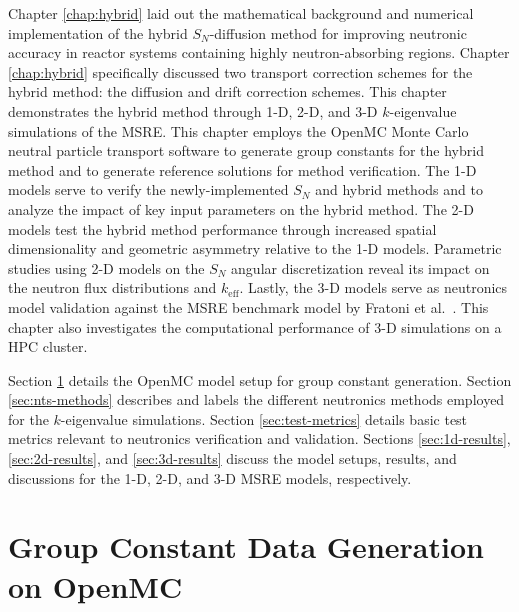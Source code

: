 Chapter \ref{chap:hybrid} laid out the mathematical background and numerical implementation
of the hybrid $S_N$-diffusion method for improving neutronic accuracy in reactor systems containing
highly neutron-absorbing regions. Chapter \ref{chap:hybrid} specifically discussed two transport
correction schemes for the hybrid method: the diffusion and drift correction
schemes. This chapter demonstrates
the hybrid method through 1-D, 2-D, and 3-D $k$-eigenvalue simulations of the \gls{MSRE}.
This chapter employs the OpenMC Monte Carlo neutral particle transport software \cite{romano_openmc:_2015} to
generate group constants for the hybrid method and to generate reference solutions for method verification.
The 1-D models serve to verify the newly-implemented $S_N$ and hybrid methods
and to analyze the impact of key input parameters on the hybrid method. The
2-D models test the hybrid method performance through increased spatial dimensionality and
geometric asymmetry relative to the 1-D models. Parametric studies using 2-D models on the $S_N$ angular
discretization reveal its impact on the neutron flux distributions and $k_\text{eff}$.
Lastly, the 3-D models serve as neutronics model
validation against the \gls{MSRE} benchmark model by Fratoni et al.\ \cite{fratoni_molten_2020}.
This chapter also investigates the computational performance of 3-D simulations on a \gls{HPC}
cluster.

Section \ref{sec:msre-gc} details the OpenMC model setup for group constant generation. Section
\ref{sec:nts-methods} describes and labels the different neutronics methods employed for the
$k$-eigenvalue simulations. Section \ref{sec:test-metrics} details basic test metrics relevant to
neutronics verification and validation. Sections \ref{sec:1d-results}, \ref{sec:2d-results}, and
\ref{sec:3d-results} discuss the model setups, results, and discussions for the 1-D, 2-D, and 3-D
\gls{MSRE} models, respectively.

\section{Group Constant Data Generation on OpenMC} \label{sec:msre-gc}

